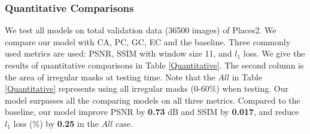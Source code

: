 \documentclass[letterpaper]{article} %
\begin{document}
\subsubsection{Quantitative Comparisons}
We test all models on total validation data (36500 images) of Places2. We compare our model with CA, PC, GC, EC and the baseline. Three commonly used metrics are used: PSNR, SSIM \cite{wang2004image} with window size 11, and $l_1$ loss. We give the results of quantitative comparisons in Table \ref{Quantitative}. The second column is the area of irregular masks at testing time. Note that the $All$ in Table \ref{Quantitative} represents using all irregular masks (0-60\%) when testing. Our model surpasses all the comparing models on all three metrics. Compared to the baseline, our model improve PSNR by \textbf{0.73} dB and SSIM by \textbf{0.017}, and reduce $l_1$ loss (\%) by \textbf{0.25} in the $All$ case. 
\end{document}
